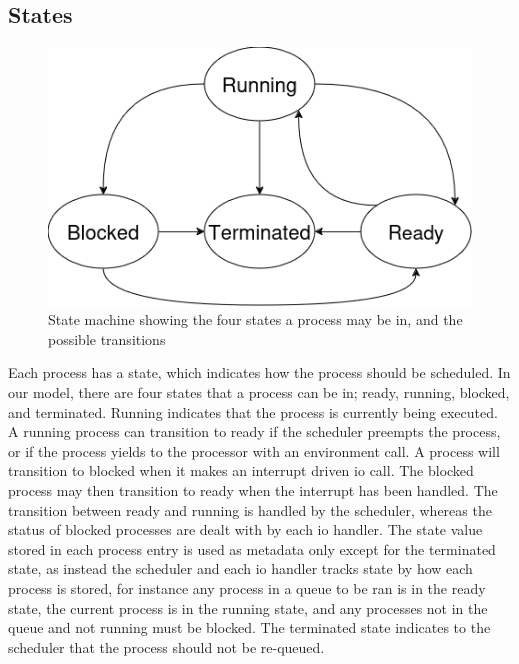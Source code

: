 \subsection{States}
\begin{figure}[H]
    \includegraphics[width=0.8\columnwidth]{figures/states.png}
    \centering
    \caption[State Diagram]{State machine showing the four states a process may be in, and the possible transitions}
\end{figure}
Each process has a state, which indicates how the process should be scheduled. In our model, there are four states that a process can be in; ready, running, blocked, and terminated. Running indicates that the process is currently being executed. A running process can transition to ready if the scheduler preempts the process, or if the process yields to the processor with an environment call. A process will transition to blocked when it makes an interrupt driven \ac{io} call. The blocked process may then transition to ready when the interrupt has been handled. The transition between ready and running is handled by the scheduler, whereas the status of blocked processes are dealt with by each \ac{io} handler. The state value stored in each process entry is used as metadata only except for the terminated state, as instead the scheduler and each \ac{io} handler tracks state by how each process is stored, for instance any process in a queue to be ran is in the ready state, the current process is in the running state, and any processes not in the queue and not running must be blocked. The terminated state indicates to the scheduler that the process should not be re-queued.

